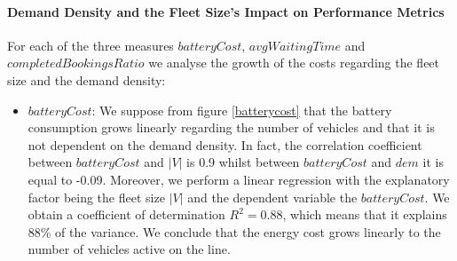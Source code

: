 \documentclass[12pt,a4paper]{article}
\begin{document}
\paragraph{Demand Density and the Fleet Size's Impact on Performance Metrics}
For each of the three measures $batteryCost$, $avgWaitingTime$ and $completedBookingsRatio$ we analyse the growth of the costs regarding the fleet size and the demand density:
\begin{itemize}
\item $batteryCost$: We suppose from figure \ref{batterycost} that the battery consumption grows linearly regarding the number of vehicles and that it is not dependent on the demand density. In fact, the correlation coefficient between $batteryCost$ and $|V|$ is 0.9 whilst between $batteryCost$ and $dem$ it is equal to -0.09. Moreover, we perform a linear regression with the explanatory factor being the fleet size $|V|$ and the dependent variable the $batteryCost$. We obtain a coefficient of determination $R^{2} = 0.88$, which means that it explains 88\% of the variance. We conclude that the energy cost grows linearly to the number of vehicles active on the line. 


\end{itemize}
\end{document}
